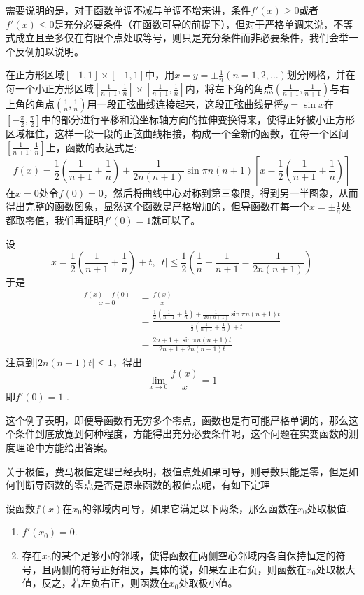 \begin{example}
需要说明的是，对于函数单调不减与单调不增来讲，条件$f'(x) \geqslant 0$或者$f'(x) \leqslant 0$是充分必要条件（在函数可导的前提下），但对于严格单调来说，不等式成立且至多仅在有限个点处取等号，则只是充分条件而非必要条件，我们会举一个反例加以说明。

在正方形区域$[-1,1]\times[-1,1]$中，用$x=y=\pm \frac{1}{n}(n=1,2,\ldots)$划分网格，并在每一个小正方形区域$[\frac{1}{n+1},\frac{1}{n}] \times [\frac{1}{n+1},\frac{1}{n}]$内，将左下角的角点$\left(\frac{1}{n+1},\frac{1}{n+1}\right)$与右上角的角点$\left(\frac{1}{n},\frac{1}{n}\right)$用一段正弦曲线连接起来，这段正弦曲线是将$y=\sin{x}$在$\left[ -\frac{\pi}{2}, \frac{\pi}{2} \right]$中的部分进行平移和沿坐标轴方向的拉伸变换得来，使得正好被小正方形区域框住，这样一段一段的正弦曲线相接，构成一个全新的函数，在每一个区间$[\frac{1}{n+1},\frac{1}{n}]$上，函数的表达式是:
\[ f(x) = \frac{1}{2} \left( \frac{1}{n+1} + \frac{1}{n} \right) + \frac{1}{2n(n+1)} \sin{\pi n(n+1) \left[ x - \frac{1}{2} \left( \frac{1}{n+1} + \frac{1}{n} \right) \right]} \]
在$x=0$处令$f(0)=0$，然后将曲线中心对称到第三象限，得到另一半图象，从而得出完整的函数图象，显然这个函数是严格增加的，但导函数在每一个$x = \pm \frac{1}{n}$处都取零值，我们再证明$f'(0)=1$就可以了。

设
\[ x = \frac{1}{2} \left( \frac{1}{n+1} + \frac{1}{n} \right) +t, \  |t| \leqslant \frac{1}{2}\left( \frac{1}{n} - \frac{1}{n+1} = \frac{1}{2n(n+1)} \right) \]
于是
\begin{align*}
  \frac{f(x)-f(0)}{x-0} & = \frac{f(x)}{x} \\
                        & = \frac{\frac{1}{2} \left( \frac{1}{n+1} + \frac{1}{n} \right)+\frac{1}{2n(n+1)}\sin{\pi n(n+1)t}}{\frac{1}{2} \left( \frac{1}{n+1} + \frac{1}{n} \right)+t} \\
  & = \frac{2n+1+\sin{\pi n(n+1)t}}{2n+1+2n(n+1)t}
\end{align*}
注意到$|2n(n+1)t| \leqslant 1$，得出
\[ \lim_{x \to 0} \frac{f(x)}{x} = 1 \]
即$f'(0)=1$ .

这个例子表明，即便导函数有无穷多个零点，函数也是有可能严格单调的，那么这个条件到底放宽到何种程度，方能得出充分必要条件呢，这个问题在实变函数的测度理论中方能给出答案。
\end{example}


关于极值，费马极值定理已经表明，极值点处如果可导，则导数只能是零，但是如何判断导函数的零点是否是原来函数的极值点呢，有如下定理
\begin{theorem}
  设函数$f(x)$在$x_0$的邻域内可导，如果它满足以下两条，那么函数在$x_0$处取极值.
  \begin{enumerate}
  \item $f'(x_0)=0$.
  \item 存在$x_0$的某个足够小的邻域，使得函数在两侧空心邻域内各自保持恒定的符号，且两侧的符号正好相反，具体的说，如果左正右负，则函数在$x_0$处取极大值，反之，若左负右正，则函数在$x_0$处取极小值。
  \end{enumerate}
\end{theorem}

